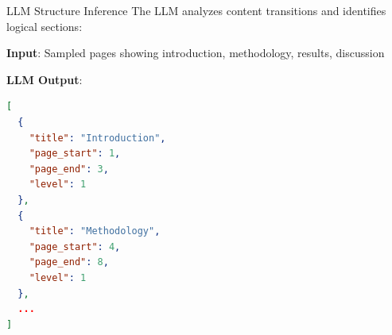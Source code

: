 \documentclass[12pt,a4paper]{article}
\begin{document}
\begin{examplebox}{LLM Structure Inference}
The LLM analyzes content transitions and identifies logical sections:

\textbf{Input}: Sampled pages showing introduction, methodology, results, discussion

\textbf{LLM Output}:
\begin{lstlisting}[language=json]
[
  {
    "title": "Introduction",
    "page_start": 1,
    "page_end": 3,
    "level": 1
  },
  {
    "title": "Methodology",
    "page_start": 4,
    "page_end": 8,
    "level": 1
  },
  ...
]
\end{lstlisting}
\end{examplebox}
\end{document}
